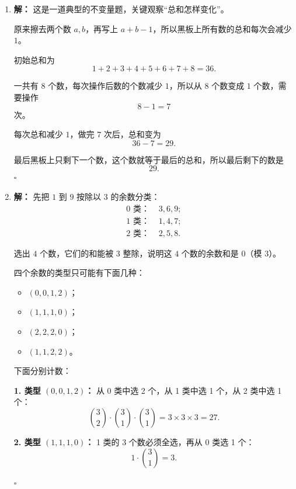 \documentclass[11pt,a4paper,fontset=fandol]{ctexart}
\theoremstyle{formalexample}
\newenvironment{solution}{\par\noindent\textbf{解：}}{\hfill$\square$\par}
\begin{document}
\begin{enumerate}
\begin{solution}
  \textbf{再看 8 步到达 4：}
  \[
  r+l=8,
  \qquad
  r-l=4.
  \]
  两式相加得
  \[
  2r=12,
  \qquad r=6,
  \qquad l=2.
  \]
  这是可行的。

  例如先向右走 $6$ 步，再向左走 $2$ 步，最后就停在 $4$。

  所以恰好走 $8$ 步到达 $4$ \textbf{可以}。
  \end{solution}

  \item \begin{solution}
  这是一道典型的不变量题，关键观察“总和怎样变化”。

  原来擦去两个数 $a,b$，再写上 $a+b-1$，所以黑板上所有数的总和每次会减少 $1$。

  初始总和为
  \[
  1+2+3+4+5+6+7+8=36.
  \]

  一共有 $8$ 个数，每次操作后数的个数减少 $1$，所以从 $8$ 个数变成 $1$ 个数，需要操作
  \[
  8-1=7
  \]
  次。

  每次总和减少 $1$，做完 $7$ 次后，总和变为
  \[
  36-7=29.
  \]

  最后黑板上只剩下一个数，这个数就等于最后的总和，所以最后剩下的数是
  \[
  29.
  \]
  \end{solution}

  \item \begin{solution}
  先把 $1$ 到 $9$ 按除以 $3$ 的余数分类：
  \[
  \begin{aligned}
  0\text{ 类： }&3,6,9;\\
  1\text{ 类： }&1,4,7;\\
  2\text{ 类： }&2,5,8.
  \end{aligned}
  \]

  选出 $4$ 个数，它们的和能被 $3$ 整除，说明这 $4$ 个数的余数和是 $0$（模 $3$）。

  四个余数的类型只可能有下面几种：
  \begin{itemize}
    \item $(0,0,1,2)$；
    \item $(1,1,1,0)$；
    \item $(2,2,2,0)$；
    \item $(1,1,2,2)$。
  \end{itemize}

  下面分别计数：

  \textbf{1. 类型 $(0,0,1,2)$：}
  从 0 类中选 2 个，从 1 类中选 1 个，从 2 类中选 1 个：
  \[
  \binom32\cdot \binom31\cdot \binom31=3\times 3\times 3=27.
  \]

  \textbf{2. 类型 $(1,1,1,0)$：}
  1 类的 3 个数必须全选，再从 0 类选 1 个：
  \[
  1\cdot \binom31=3.
  \]


\end{solution}
\end{enumerate}
\end{document}
